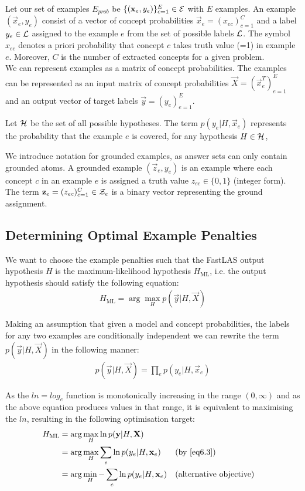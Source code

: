 Let our set of examples $E_{prob}$ be $\{(\vec{x}_e, y_e)\}_{e=1}^{E} \in \curly{E}$ with $E$ examples. 
An example $(\vec{x}_e, y_e)$ consist of a vector of concept probabilities $\vec{x}_e = (x_{ec})_{c=1}^C$ and a label $y_e \in \curly{L}$ assigned to the example $e$ from the set of possible labels $\curly{L}$.
The symbol $x_{ec}$ denotes a priori probability that concept $c$ takes truth value (=1) in example $e$.
Moreover, $C$ is the number of extracted concepts for a given problem. \\
We can represent examples as a matrix of concept probabilities.  
The examples can be represented as an input matrix of concept probabilities $\vec{X} = (\vec{x}_e^T)_{e=1}^E$ and an output vector of target labels $\vec{y} = (y_e)_{e=1}^E$.

Let $\curly{H}$ be the set of all possible hypotheses. The term $p(y_e|H, \vec{x}_{e})$ represents the probability that the example $e$ is covered, for any hypothesis $H \in \curly{H}$,


We introduce notation for grounded examples, as answer sets can only contain grounded atoms.
A grounded example $(\vec{z}_e, y_e)$ is an example where each concept $c$ in an example $e$ is assigned a truth value $z_{ec} \in \{0,1\}$ (integer form). 
The term $\vec{z}_e = (z_{ec})_{c=1}^C \in \curly{Z}_e$  is a binary vector representing the ground assignment. 

\subsection{Determining Optimal Example Penalties}

We want to choose the example penalties such that the FastLAS output hypothesis $H$ is the maximum-likelihood hypothesis $H_{\text{ML}}$, i.e. the output hypothesis should satisfy the following equation:
\begin{align}
H_{\text{ML}} = \arg\max_{H}
p(\vec{y}|H, \vec{X})
\end{align}

Making an assumption that given a model and concept probabilities, the labels for any two examples are conditionally independent we can rewrite the term $p(\vec{y}|H, \vec{X})$ in the following manner:
\begin{align}
p(\vec{y}|H, \vec{X})
= \prod_{e} p(y_e|H, \vec{x}_e) \label{eq6.3}
\end{align}


As the $ln = log_e$ function is monotonically increasing in the range $(0, \infty)$ and as the above equation produces values in that range, it is equivalent to maximising the $ln$, resulting in the following optimisation target:
\begin{align}
H_{\text{ML}}
& = \arg\max_{H}
\ln p(\vec{y}|H, \vec{X}) \nonumber \\
& = \arg\max_{H}
\sum_{e} \ln p(y_e|H, \vec{x}_e) && \text{(by \ref{eq6.3})} \nonumber \\
& = \arg\min_{H}
-\sum_{e} \ln p(y_e|H, \vec{x}_e) && \text{(alternative objective)} \label{ex6.4}
\end{align}


